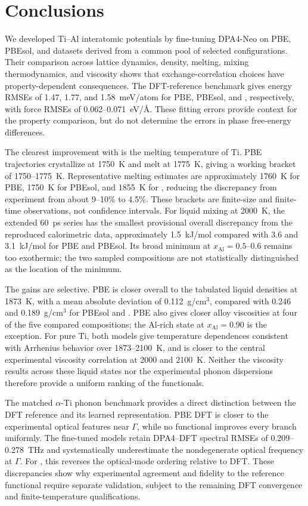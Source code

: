 \section{Conclusions}
\label{sec:conclusions}

We developed Ti--Al interatomic potentials by fine-tuning DPA4-Neo on PBE, PBEsol, and \rscan{} datasets derived from a common pool of selected configurations.
Their comparison across lattice dynamics, density, melting, mixing thermodynamics, and viscosity shows that exchange-correlation choices have property-dependent consequences.
The DFT-reference benchmark gives energy RMSEs of 1.47, 1.77, and 1.58~meV/atom for PBE, PBEsol, and \rscan{}, respectively, with force RMSEs of 0.062--0.071~eV/\AA.
These fitting errors provide context for the property comparison, but do not determine the errors in phase free-energy differences.

The clearest improvement with \rscan{} is the melting temperature of Ti.
PBE trajectories crystallize at 1750~K and melt at 1775~K, giving a working bracket of 1750--1775~K.
Representative melting estimates are approximately 1760~K for PBE, 1750~K for PBEsol, and 1855~K for \rscan{}, reducing the discrepancy from experiment from about 9--10\% to 4.5\%.
These brackets are finite-size and finite-time observations, not confidence intervals.
For liquid mixing at 2000~K, the extended 60~ps \rscan{} series has the smallest provisional overall discrepancy from the reproduced calorimetric data, approximately 1.5~kJ/mol compared with 3.6 and 3.1~kJ/mol for PBE and PBEsol.
Its broad minimum at $x_{\mathrm{Al}}=0.5$--0.6 remains too exothermic; the two sampled compositions are not statistically distinguished as the location of the minimum.

The gains are selective.
PBE is closer overall to the tabulated liquid densities at 1873~K, with a mean absolute deviation of 0.112~g/cm$^3$, compared with 0.246 and 0.189~g/cm$^3$ for PBEsol and \rscan{}.
PBE also gives closer alloy viscosities at four of the five compared compositions; the Al-rich state at $x_{\mathrm{Al}}=0.90$ is the exception.
For pure Ti, both models give temperature dependences consistent with Arrhenius behavior over 1873--2100~K, and \rscan{} is closer to the central experimental viscosity correlation at 2000 and 2100~K.
Neither the viscosity results across these liquid states nor the experimental phonon dispersions therefore provide a uniform ranking of the functionals.

The matched $\alpha$-Ti phonon benchmark provides a direct distinction between the DFT reference and its learned representation.
PBE DFT is closer to the experimental optical features near $\Gamma$, while no functional improves every branch uniformly.
The fine-tuned models retain DPA4--DFT spectral RMSEs of 0.209--0.278~THz and systematically underestimate the nondegenerate optical frequency at $\Gamma$.
For \rscan{}, this reverses the optical-mode ordering relative to DFT.
These discrepancies show why experimental agreement and fidelity to the reference functional require separate validation, subject to the remaining DFT convergence and finite-temperature qualifications.

